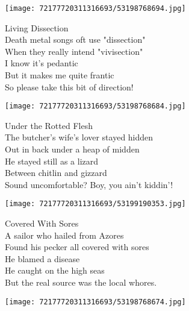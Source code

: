 \documentclass[10pt,letterpaper]{article}
\begin{document}
\begin{center}
\texttt{[image: 72177720311316693/53198768694.jpg]}
\end{center}

\begin{center}
Living Dissection\\
\vskip 0.2in
Death metal songs oft use "dissection"\\
When they really intend "vivisection"\\
I know it's pedantic\\
But it makes me quite frantic\\
So please take this bit of direction!\\
\end{center}
\pagebreak

\begin{center}\texttt{[image: 72177720311316693/53198768684.jpg]}
\end{center}
\begin{center}
Under the Rotted Flesh\\
\vskip 0.2in
The butcher's wife's lover stayed hidden\\
Out in back under a heap of midden\\
He stayed still as a lizard\\
Between chitlin and gizzard\\
Sound uncomfortable?  Boy, you ain't kiddin'!\\
\end{center}
\pagebreak

\begin{center}\texttt{[image: 72177720311316693/53199190353.jpg]}
\end{center}
\begin{center}
Covered With Sores\\
\vskip 0.2in
A sailor who hailed from Azores\\
Found his pecker all covered with sores\\
He blamed a disease\\
He caught on the high seas\\
But the real source was the local whores.\\
\end{center}
\pagebreak

\begin{center}
\texttt{[image: 72177720311316693/53198768674.jpg]}
\end{center}
\end{document}
